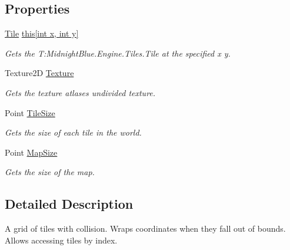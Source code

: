 \subsection*{Properties}
\begin{DoxyCompactItemize}
\item 
\hyperlink{class_midnight_blue_1_1_tile}{Tile} \hyperlink{class_midnight_blue_1_1_engine_1_1_tiles_1_1_tile_map_aaa31f70007fee9ded9c727d2eceda1b5}{this\mbox{[}int x, int y\mbox{]}}
\begin{DoxyCompactList}\small\item\em Gets the T\+:\+Midnight\+Blue.\+Engine.\+Tiles.\+Tile at the specified x y. \end{DoxyCompactList}\item 
Texture2D \hyperlink{class_midnight_blue_1_1_engine_1_1_tiles_1_1_tile_map_a2cac83aafbdbffe76d092adc29a32f60}{Texture}
\begin{DoxyCompactList}\small\item\em Gets the texture atlases undivided texture. \end{DoxyCompactList}\item 
Point \hyperlink{class_midnight_blue_1_1_engine_1_1_tiles_1_1_tile_map_a5401474616db996c4755c634cdd056eb}{Tile\+Size}
\begin{DoxyCompactList}\small\item\em Gets the size of each tile in the world. \end{DoxyCompactList}\item 
Point \hyperlink{class_midnight_blue_1_1_engine_1_1_tiles_1_1_tile_map_ac67e4df079e26f5383bc970f77a9ab3d}{Map\+Size}
\begin{DoxyCompactList}\small\item\em Gets the size of the map. \end{DoxyCompactList}\end{DoxyCompactItemize}


\subsection{Detailed Description}
A grid of tiles with collision. Wraps coordinates when they fall out of bounds. Allows accessing tiles by index. 




